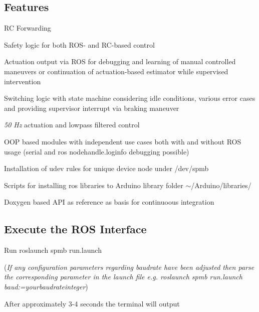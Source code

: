 \subsection*{Features}


\begin{DoxyItemize}
\item RC Forwarding
\item Safety logic for both R\+O\+S-\/ and R\+C-\/based control
\item Actuation output via R\+OS for debugging and learning of manual controlled maneuvers or continuation of actuation-\/based estimator while supervised intervention
\item Switching logic with state machine considering idle conditions, various error cases and providing supervisor interrupt via braking maneuver
\item {\itshape 50 Hz} actuation and lowpass filtered control
\item O\+OP based modules with independent use cases both with and without R\+OS usage (serial and ros nodehandle.\+loginfo debugging possible)
\item Installation of udev rules for unique device node under {\ttfamily /dev/spmb}
\item Scripts for installing ros libraries to Arduino library folder {\ttfamily $\sim$/\+Arduino/libraries/}
\item Doxygen based A\+PI as reference as basis for continuoous integration
\end{DoxyItemize}





\subsection*{Execute the R\+OS Interface}


\begin{DoxyItemize}
\item Run {\ttfamily roslaunch spmb run.\+launch}
\end{DoxyItemize}

({\itshape If any configuration parameters regarding baudrate have been adjusted then parse the corresponding parameter in the launch file e.\+g. {\ttfamily roslaunch spmb run.\+launch baud\+:=yourbaudrateinteger}})


\begin{DoxyItemize}
\item After approximately 3-\/4 seconds the terminal will output
\end{DoxyItemize}


